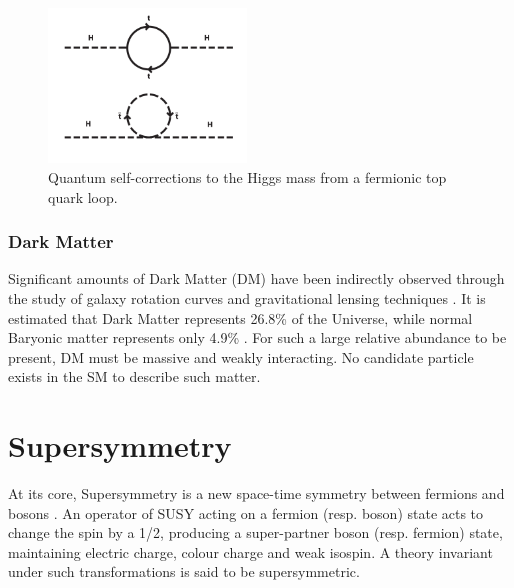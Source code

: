 \begin{figure}[t]
\centering
\includegraphics[width=0.47\textwidth,trim=0 250 0 0, clip=true]
{Figs/feynman/600px-Hqmc-vector.png}
\caption{Quantum self-corrections to the Higgs mass from a fermionic top quark
loop.}
\label{fig:quantum_higgs_fermion_loop}
\end{figure}

\subsubsection{Dark Matter}
Significant amounts of Dark Matter (DM) have been indirectly observed
through the study of galaxy rotation curves and
gravitational lensing techniques \cite{Bertone:2004pz}. It is 
estimated that Dark Matter represents 26.8\% of the Universe, while normal Baryonic
matter represents only 4.9\% \cite{Clowe:2006eq}. For
such a large relative abundance to be present, DM must be massive and weakly
interacting. No candidate particle exists in the SM to describe such
matter.

\section{Supersymmetry}  %
\label{sec:theory_overview}
At its core, Supersymmetry is a new space-time symmetry
between fermions and bosons \cite{ref:SUSY-1,ref:SUSY0,ref:SUSY1,ref:SUSY2,ref:SUSY3,ref:SUSY4}.
An operator of SUSY acting on a fermion
(resp. boson) state acts to change the spin by a 1/2, producing a super-partner
boson (resp. fermion) state, maintaining electric charge, colour charge and weak
isospin. A theory invariant under such transformations is said to be
supersymmetric.

